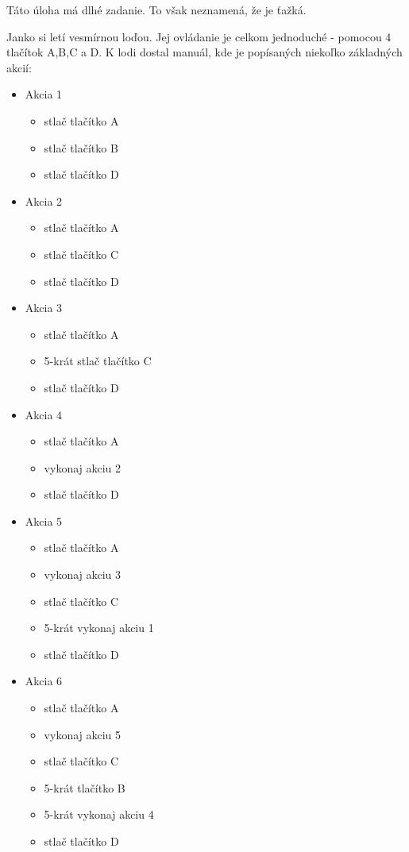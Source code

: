 




Táto úloha má dlhé zadanie. To však neznamená, že je ťažká.

Janko si letí vesmírnou loďou. Jej ovládanie je celkom jednoduché - pomocou 4 tlačítok A,B,C a D. K
lodi dostal manuál, kde je popísaných niekoľko základných akcií:

\begin{itemize}
	\item Akcia 1
	\begin{itemize}
		\item stlač tlačítko A
		\item stlač tlačítko B
		\item stlač tlačítko D
	\end{itemize}

	\item Akcia 2
	\begin{itemize}
		\item stlač tlačítko A
		\item stlač tlačítko C
		\item stlač tlačítko D
	\end{itemize}

	\item Akcia 3
	\begin{itemize}
		\item stlač tlačítko A
		\item 5-krát stlač tlačítko C
		\item stlač tlačítko D
	\end{itemize}

	\item Akcia 4
	\begin{itemize}
		\item stlač tlačítko A
		\item vykonaj akciu 2
		\item stlač tlačítko D
	\end{itemize}

	\item Akcia 5
	\begin{itemize}
		\item stlač tlačítko A
		\item vykonaj akciu 3
		\item stlač tlačítko C
		\item 5-krát vykonaj akciu 1
		\item stlač tlačítko D
	\end{itemize}

	\item Akcia 6
	\begin{itemize}
		\item stlač tlačítko A
		\item vykonaj akciu 5
		\item stlač tlačítko C
		\item 5-krát tlačítko B
		\item 5-krát vykonaj akciu 4
		\item stlač tlačítko D
	\end{itemize}

\end{itemize}
